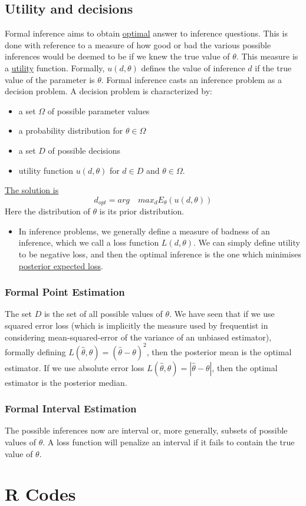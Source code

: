 \documentclass[lecture,12pt,]{pcms-l}
\numberwithin{section}{chapter}
\numberwithin{equation}{chapter}
\theoremstyle{plain}
\theoremstyle{definition}
\theoremstyle{definition}
\begin{document}
\section{Utility and decisions}
Formal inference aims to obtain \underline{optimal} answer to inference questions. This is done with reference to a measure of how good or bad the various possible inferences would be deemed to be if we knew the true value of $\theta$. This measure is a \underline{utility} function. Formally, $u(d,\theta)$ defines the value of inference $d$ if the true value of the parameter is $\theta$. Formal inference casts an inference problem as a decision problem. A decision problem is characterized by:
\begin{itemize}
\item a set $\Omega$ of possible parameter values
\item a probability distribution for $\theta \in \Omega$
\item a set $D$ of possible decisions
\item utility function $u(d,\theta)$ for $d \in D$ and $\theta \in \Omega$.
\end{itemize}
\underline{The solution is}
\begin{equation}
\boxed{d_{opt}=arg \quad max_d E_{\theta}(u(d, \theta))}
\end{equation}
Here the distribution of $\theta$ is its prior distribution.
\begin{itemize}
\item In inference problems, we generally define a measure of badness of an inference, which we call a loss function $L(d, \theta)$. We can simply define utility to be negative loss, and then the optimal inference is the one which minimises \underline{posterior expected loss}.
\end{itemize}
\subsection{Formal Point Estimation}
The set $D$ is the set of all possible values of $\theta$. We have seen that if we use squared error loss (which is implicitly the measure used by frequentist in considering mean-squared-error of the variance of an unbiased estimator), formally defining $L(\hat{\theta}, \theta)=(\hat{\theta}-\theta)^2$, then the posterior mean is the optimal estimator. If we use absolute error loss $L(\hat{\theta}, \theta)=\left | \hat{\theta}-\theta \right |$, then the optimal estimator is the posterior median.
\subsection{Formal Interval Estimation}
The possible inferences now are interval or, more generally, subsets of possible values of $\theta$. A loss function will penalize an interval if it fails to contain the true value of $\theta$.
\appendix
\chapter*{R Codes}







\end{document}
